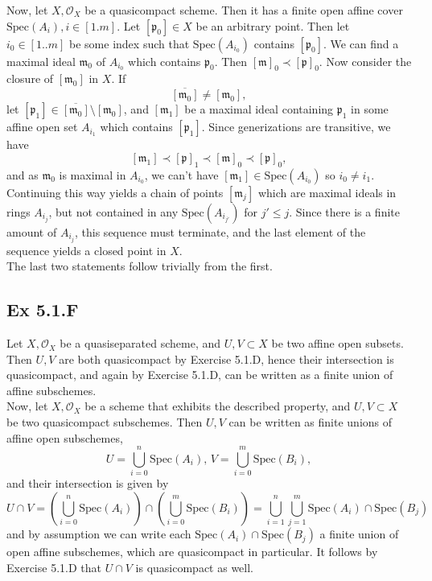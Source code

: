 \documentclass{article}
\theoremstyle{definition}
\newcommand{\oo}{\mathcal{O}}
\newcommand{\Spec}{\text{Spec}}
\begin{document}
Now, let $X, \mathcal{O}_X$ be a quasicompact scheme. Then it has a finite open
affine cover $\Spec(A_i), i \in [1.m]$. Let $[\mathfrak{p}_0] \in X$ be an
arbitrary point. Then let $i_0 \in [1..m]$ be some index such that
$\Spec(A_{i_0})$ contains $[\mathfrak{p}_0]$. We can find a maximal ideal
$\mathfrak{m}_0$ of $A_{i_0}$ which contains $\mathfrak{p}_0$. Then
$[\mathfrak{m}]_0 \prec [\mathfrak{p}]_0$. Now consider the closure of
$[\mathfrak{m}_0]$ in $X$. If
\[
	\overline{[\mathfrak{m}_0]} \not = [\mathfrak{m}_0],
\]
let $[\mathfrak{p}_1] \in \overline{[\mathfrak{m}_0]} \setminus
	[\mathfrak{m}_0]$, and $[\mathfrak{m}_1]$ be a maximal ideal containing
$\mathfrak{p}_1$ in some affine open set $A_{i_1}$ which contains
$[\mathfrak{p}_1]$. Since generizations are transitive, we have
\[
	[\mathfrak{m}_1] \prec [\mathfrak{p}]_1 \prec [\mathfrak{m}]_0 \prec [\mathfrak{p}]_0,
\]
and as $\mathfrak{m}_0$ is maximal in $A_{i_0}$, we can't have
$[\mathfrak{m}_1] \in \Spec(A_{i_0})$ so $i_0 \not = i_1$. Continuing this way
yields a chain of points $[\mathfrak{m}_{j}]$ which are maximal ideals in rings
$A_{i_j}$, but not contained in any $\Spec(A_{i_{j'}})$ for $j' \le j$. Since
there is a finite amount of $A_{i_j}$, this sequence must terminate, and the
last element of the sequence yields a closed point in $X$. \\

The last two statements follow trivially from the first.

\subsection*{Ex 5.1.F}

Let $X, \mathcal{O}_X$ be a quasiseparated scheme, and $U, V \subset X$ be two
affine open subsets. Then $U, V$ are both quasicompact by Exercise 5.1.D, hence
their intersection is quasicompact, and again by Exercise 5.1.D, can be written
as a finite union of affine subschemes. \\

Now, let $X, \oo_{X}$ be a scheme that exhibits the described property, and $U,
	V \subset X$ be two quasicompact subschemes. Then $U, V$ can be written as
finite unions of affine open subschemes,
\[
	U = \bigcup_{i=0}^{n} \Spec(A_i),\,
	V = \bigcup_{i=0}^{m} \Spec(B_i),
\]
and their intersection is given by
\[
	U \cap V
	=
	\left(\bigcup_{i=0}^{n} \Spec(A_i)\right)
	\cap
	\left(\bigcup_{i=0}^{m} \Spec(B_i)\right)
	=
	\bigcup_{i = 1}^{n}
	\bigcup_{j = 1}^{m}
	\Spec(A_i) \cap \Spec(B_j)
\]
and by assumption we can write each $\Spec(A_i) \cap \Spec(B_j)$ a finite union
of open affine subschemes, which are quasicompact in particular. It follows by
Exercise 5.1.D that $U \cap V$ is quasicompact as well.
\end{document}
